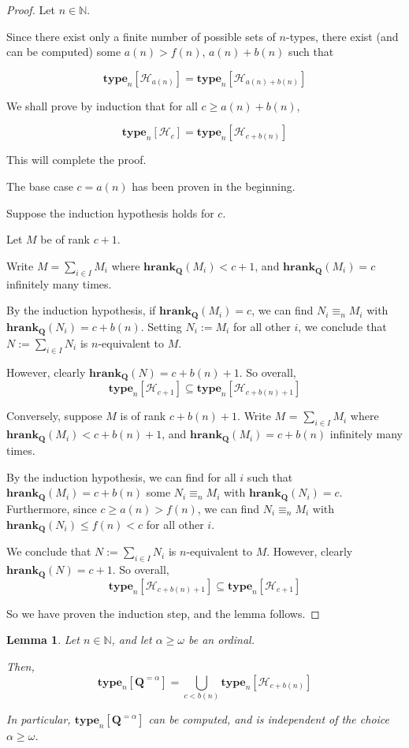 \documentclass{article}
\newtheorem{lemma}{Lemma}
\newcommand{\brackets}[1]{\left[ {#1} \right]}
\newcommand{\hrank}[1]{\mathbf{hrank}_{\qq}\left( #1 \right)}
\newcommand{\qq}{\mathbf{Q}}
\newcommand{\NN}{\mathbb{N}}
\newcommand{\type}[2]{\mathbf{type}_{#1} \brackets{#2}}
\begin{document}
\begin{proof}
  Let $n \in \NN$.

  Since there exist only a finite number of possible
  sets of $n$-types, there exist (and can be computed)
  some $a(n) > f(n)$, $a(n) + b(n)$ such that
  
  $$\type{n}{\mathcal{H}_{a(n)}} = \type{n}{\mathcal{H}_{a(n) + b(n)}}$$
  
  We shall prove by induction that for all $c \ge a(n) + b(n)$,

  $$\type{n}{\mathcal{H}_{c}} = \type{n}{\mathcal{H}_{c + b(n)}}$$

  This will complete the proof.

  The base case $c = a(n)$ has been proven in the beginning.

  Suppose the induction hypothesis holds for $c$.

  Let $M$ be of rank $c + 1$.

  Write $M = \sum_{i \in I} M_i$ where $\hrank{M_i} < c + 1$,
  and $\hrank{M_i} = c$ infinitely many times.

  By the induction hypothesis,
  if $\hrank{M_i} = c$, we can find $N_i \equiv_n M_i$ with $\hrank{N_i} = c + b(n)$.
  Setting $N_i := M_i$ for all other $i$, we conclude that $N := \sum_{i \in I} N_i$
  is $n$-equivalent to $M$.

  However, clearly $\hrank{N} = c + b(n) + 1$. So overall,
  $$\type{n}{\mathcal{H}_{c + 1}} \subseteq \type{n}{\mathcal{H}_{c + b(n) + 1}}$$

  Conversely, suppose $M$ is of rank $c + b(n) + 1$.
  Write $M$ = $\sum_{i \in I} M_i$ where $\hrank{M_i} < c + b(n) + 1$,
  and $\hrank{M_i} = c + b(n)$ infinitely many times.

  By the induction hypothesis,
  we can find for all $i$ such that $\hrank{M_i} = c + b(n)$ some 
  $N_i \equiv_n M_i$ with $\hrank{N_i} = c$.
  Furthermore, since $c \ge a(n) > f(n)$, we can
  find $N_i \equiv_n M_i$ with $\hrank{N_i} \le f(n) < c$ for all other $i$.

  We conclude that $N := \sum_{i \in I} N_i$ is $n$-equivalent to $M$.
  However, clearly $\hrank{N} = c + 1$. So overall,
  $$\type{n}{\mathcal{H}_{c + b(n) + 1}} \subseteq \type{n}{\mathcal{H}_{c + 1}}$$

  So we have proven the induction step, and the lemma follows.
\end{proof}

\begin{lemma}
  Let $n \in \NN$, and let $\alpha \ge \omega$ be an ordinal.

  Then,
  $$\type{n}{\qq^{= \alpha}} = \bigcup_{c < b(n)}{\type{n}{\mathcal{H}_{c + b(n)}}}$$

  In particular, $\type{n}{\qq^{= \alpha}}$ can be
  computed, and is independent of the choice $\alpha \ge \omega$.
\end{lemma}
\end{document}
